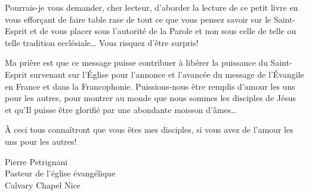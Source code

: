 \begin{preface}
Pourrais-je vous demander, cher lecteur, d'aborder la lecture de ce petit livre en vous efforçant de faire
 table rase de tout ce que vous pensez savoir sur le Saint-Esprit et de vous placer sous l'autorité de la Parole
 et non sous celle de telle ou telle tradition ecclésiale\dots{} Vous risquez d'être surpris!

Ma prière est que ce message puisse contribuer à libérer \Og la puissance du Saint-Esprit survenant sur l'\'Eglise \Fg{}
 pour l'annonce et l'avancée du message de l'\'Evangile en France et dans la Francophonie.
 Puissions-nous être remplis d'amour les uns pour les autres,
 pour montrer au monde que nous sommes les disciples de Jésus
 et qu'Il puisse être glorifié par une abondante moisson d'âmes\dots{}

\begin{Center}
\normalfont \Og \`A ceci tous connaîtront que vous êtes mes disciples,
 si vous avez de l'amour les uns pour les autres! \Fg{}
\end{Center}

\begin{flushright}
Pierre Petrignani\\
Pasteur de l'église évangélique\\
\Og Calvary Chapel Nice \Fg
\end{flushright}


\end{preface}


